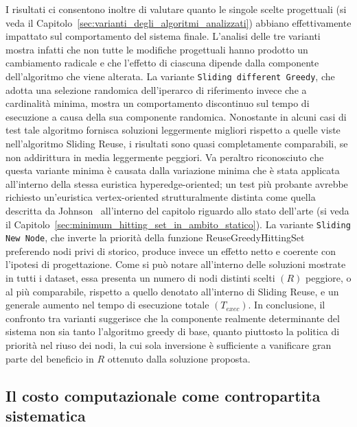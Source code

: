 I risultati ci consentono inoltre di valutare quanto le singole scelte progettuali (si veda il Capitolo~\ref{sec:varianti_degli_algoritmi_analizzati}) abbiano effettivamente impattato sul comportamento del sistema finale.
L'analisi delle tre varianti mostra infatti che non tutte le modifiche progettuali hanno prodotto un cambiamento radicale e che l'effetto di ciascuna dipende dalla componente dell'algoritmo che viene alterata.
La variante \texttt{Sliding different Greedy}, che adotta una selezione randomica dell'iperarco di riferimento invece che a cardinalità minima, mostra un comportamento discontinuo sul tempo di esecuzione a causa della sua componente randomica.
Nonostante in alcuni casi di test tale algoritmo fornisca soluzioni leggermente migliori rispetto a quelle viste nell'algoritmo Sliding Reuse, i risultati sono quasi completamente comparabili, se non addirittura in media leggermente peggiori.
Va peraltro riconosciuto che questa variante minima è causata dalla variazione minima che è stata applicata all'interno della stessa euristica hyperedge-oriented; un test più probante avrebbe richiesto un'euristica vertex-oriented strutturalmente distinta come quella descritta da Johnson~\cite{johnson1974} all'interno del capitolo riguardo allo stato dell'arte (si veda il Capitolo~\ref{sec:minimum_hitting_set_in_ambito_statico}).
La variante \texttt{Sliding New Node}, che inverte la priorità della funzione ReuseGreedyHittingSet preferendo nodi privi di storico, produce invece un effetto netto e coerente con l'ipotesi di progettazione.
Come si può notare all'interno delle soluzioni mostrate in tutti i dataset, essa presenta un numero di nodi distinti scelti $(R)$ peggiore, o al più comparabile, rispetto a quello denotato all'interno di Sliding Reuse, e un generale aumento nel tempo di esecuzione totale $(T_{exec})$.
In conclusione, il confronto tra varianti suggerisce che la componente realmente determinante del sistema non sia tanto l'algoritmo greedy di base, quanto piuttosto la politica di priorità nel riuso dei nodi, la cui sola inversione è sufficiente a vanificare gran parte del beneficio in $R$ ottenuto dalla soluzione proposta.

\subsection*{Il costo computazionale come contropartita sistematica}

